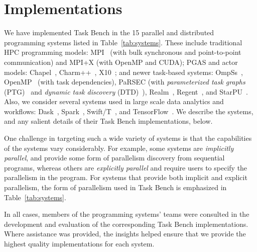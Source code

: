 \section{Implementations}
\label{sec:implementation}



We have implemented Task Bench in the 15 parallel and distributed
programming systems listed in Table~\ref{tab:systems}. These include
traditional HPC programming models: MPI~\cite{MPI} (with bulk
synchronous and point-to-point communication) and MPI+X (with OpenMP
and CUDA); PGAS and actor models: Chapel~\cite{Chapel15},
Charm++~\cite{Charmpp93}, X10~\cite{X1005}; and newer task-based
systems: OmpSs~\cite{OmpSs11}, OpenMP~\cite{OpenMPSpec40} (with task
dependencies), PaRSEC (with \emph{parameterized task graphs}
(PTG)~\cite{PARSEC13} and \emph{dynamic task discovery}
(DTD)~\cite{PARSEC_DTD}), Realm~\cite{Realm14},
Regent~\cite{Regent15}, and StarPU~\cite{StarPU11}. Also, we consider
several systems used in large scale data analytics and workflows:
Dask~\cite{Dask15}, Spark~\cite{Spark10}, Swift/T~\cite{Wozniak13},
and TensorFlow~\cite{TensorFlow15}. We describe the systems, and any
salient details of their Task Bench implementations, below.

One challenge in targeting such a wide variety of
systems is that the capabilities of the systems vary considerably. For
example, some systems are \emph{implicitly parallel}, and provide some
form of parallelism discovery from sequential programs, whereas others
are \emph{explicitly parallel} and require users to specify the
parallelism in the program. For systems that provide both implicit and explicit parallelism, the form of parallelism used in Task Bench is emphasized in Table~\ref{tab:systems}.



In all cases, members of the programming systems' teams
were consulted in the development and evaluation of the
corresponding Task Bench implementations. Where assistance was provided, the insights helped ensure that we provide the highest quality implementations for each system.

